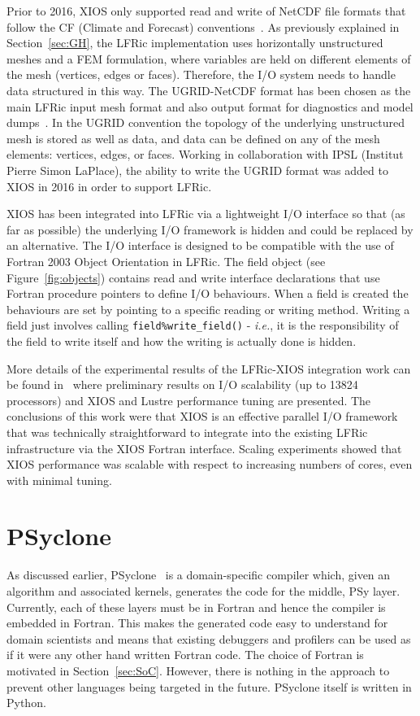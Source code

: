 \documentclass[review,times]{elsarticle}
\begin{document}
Prior to 2016, XIOS only supported read and write of NetCDF file formats that follow the CF
(Climate and Forecast) conventions~\cite{CFWeb}.  As previously explained in Section~\ref{sec:GH},
the LFRic implementation uses horizontally unstructured meshes and a FEM formulation,
where variables are held on different elements of the mesh (vertices, edges or faces).
Therefore, the I/O system needs to handle data structured in this way. The UGRID-NetCDF
format has been chosen as the main LFRic input mesh format and also output format for
diagnostics and model dumps~\cite{UgridSpec}. In the UGRID convention the topology of the
underlying unstructured mesh is stored as well as data, and data can be defined on any of
the mesh elements: vertices, edges, or faces. Working in collaboration with IPSL
(Institut Pierre Simon LaPlace), the ability to write the UGRID format was added to XIOS
in 2016 in order to support LFRic. 

XIOS has been integrated into LFRic via a lightweight I/O interface so
that (as far as possible) the underlying I/O framework is hidden and
could be replaced by an alternative.  The I/O interface is designed to
be compatible with the use of Fortran 2003 Object Orientation in
LFRic. The field object (see Figure~\ref{fig:objects}) contains read and write
interface declarations that use Fortran procedure pointers to define
I/O behaviours. When a field is created the behaviours are set by
pointing to a specific reading or writing method. Writing a field just
involves calling \verb+field%write_field()+ - {\em i.e.}, it is the
responsibility of the field to write itself and how the writing is
actually done is hidden.

More details of the experimental results of the LFRic-XIOS integration work can be
found in~\cite{Adams2018} where preliminary results on I/O scalability (up to 13824 
processors) and XIOS and Lustre performance tuning are presented. The conclusions of
this work were that XIOS is an effective parallel I/O framework that was technically
straightforward to integrate into the existing LFRic infrastructure via the XIOS
Fortran interface. Scaling experiments showed that XIOS performance was scalable with
respect to increasing numbers of cores, even with minimal tuning.

\section{\label{sec:psyclone}PSyclone}

As discussed earlier, PSyclone~\cite{psyclone} is a domain-specific
compiler which, given an algorithm and associated kernels, generates
the code for the middle, PSy layer. Currently, each of these layers
must be in Fortran and hence the compiler is embedded in
Fortran. This makes the generated code easy to understand for domain
scientists and means that existing debuggers and profilers can be used
as if it were any other hand written Fortran code. The choice of Fortran
is motivated in Section~\ref{sec:SoC}. However, there is nothing in the
approach to prevent other languages being targeted in the future. PSyclone
 itself is written in Python.
\end{document}
